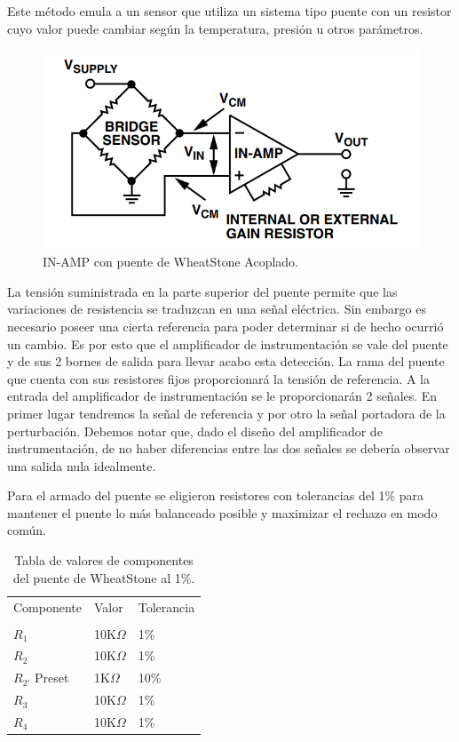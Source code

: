 Este método emula a un sensor que utiliza un sistema tipo puente con un resistor cuyo valor puede cambiar según la temperatura, presión u otros parámetros.

\begin{figure}[H]
	\centering
	\includegraphics[height=0.3\textheight]{./ImagenesVarias/wheatstoneInAmp.png}
	\caption{IN-AMP con puente de WheatStone Acoplado.}
\end{figure}

La tensión suministrada en la parte superior del puente permite que las variaciones de resistencia se traduzcan en una señal eléctrica.
Sin embargo es necesario poseer una cierta referencia para poder determinar si de hecho ocurrió un cambio. Es por esto que el amplificador de instrumentación se vale del puente y de sus 2 bornes de salida para llevar acabo esta detección. La rama del puente que cuenta con sus resistores fijos proporcionará la tensión de referencia.
A la entrada del amplificador de instrumentación se le proporcionarán 2 señales. En primer lugar tendremos la señal de referencia y por otro la señal portadora de la perturbación.
Debemos notar que, dado el diseño del amplificador de instrumentación, de no haber diferencias entre las dos señales se debería observar una salida nula idealmente.

Para el armado del puente se eligieron resistores con tolerancias del 1\% para mantener el puente lo más balanceado posible y maximizar el rechazo en modo común.
\begin{table}[H]
	\centering
	\begin{tabular}{lll}
		Componente  		& Valor        	& Tolerancia \\
		\\
		$R_1$       		& 10K$\Omega$   & 1\%        \\
		$R_2$       		& 10K$\Omega$ 	& 1\%        \\
		$R_{2'}$ Preset      & 1K$\Omega$ 	& 10\%        \\
		$R_3$  				& 10K$\Omega$   & 1\%        \\
		$R_4$ 				& 10K$\Omega$   & 1\%		\\
	\end{tabular}
	\caption{Tabla de valores de componentes del puente de WheatStone al 1\%.}
\end{table}


